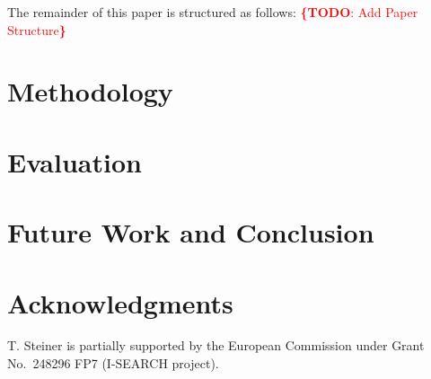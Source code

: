 \documentclass[runningheads,a4paper]{llncs}
\newcommand{\todo}[1]{\noindent\textcolor{red}{{\bf \{TODO}: #1{\bf \}}}}
\begin{document}
The remainder of this paper is structured as follows:
\todo{Add Paper Structure}

\section{Methodology}

\section{Evaluation}

\section{Future Work and Conclusion}

\section*{Acknowledgments}
T. Steiner is partially supported by the European Commission
under Grant No.~248296 FP7 (\mbox{I-SEARCH} project).



\end{document}
